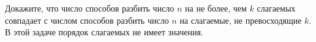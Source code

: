 Докажите, что число способов разбить число $n$ на не более, чем $k$ слагаемых совпадает с числом способов разбить число $n$
на слагаемые, не превосходящие $k$. В этой задаче порядок слагаемых не имеет значения.